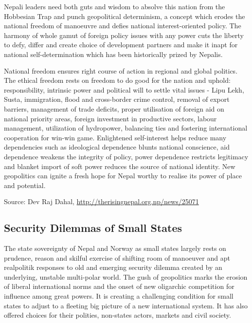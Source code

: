 \documentclass[
  openany]{book}
\begin{document}
Nepali leaders need both guts and wisdom to absolve this nation from the Hobbesian Trap and punch geopolitical determinism, a concept which erodes the national freedom of manoeuvre and defies national interest-oriented policy. The harmony of whole gamut of foreign policy issues with any power cuts the liberty to defy, differ and create choice of development partners and make it inapt for national self-determination which has been historically prized by Nepalis.

National freedom ensures right course of action in regional and global politics. The ethical freedom rests on freedom to do good for the nation and uphold: responsibility, intrinsic power and political will to settle vital issues - Lipu Lekh, Susta, immigration, flood and cross-border crime control, removal of export barriers, management of trade deficits, proper utilisation of foreign aid on national priority areas, foreign investment in productive sectors, labour management, utilization of hydropower, balancing ties and fostering international cooperation for win-win game. Enlightened self-interest helps reduce many dependencies such as ideological dependence blunts national conscience, aid dependence weakens the integrity of policy, power dependence restricts legitimacy and blanket import of soft power reduces the source of national identity. New geopolitics can ignite a fresh hope for Nepal worthy to realise its power of place and potential.

Source: Dev Raj Dahal, \url{http://therisingnepal.org.np/news/25071}

\hypertarget{security-dilemmas-of-small-states}{%
\subsection{Security Dilemmas of Small States}\label{security-dilemmas-of-small-states}}

The state sovereignty of Nepal and Norway as small states largely rests on prudence, reason and skilful exercise of shifting room of manoeuver and apt realpolitik responses to old and emerging security dilemma created by an underlying, unstable multi-polar world. The gush of geopolitics marks the erosion of liberal international norms and the onset of new oligarchic competition for influence among great powers. It is creating a challenging condition for small states to adjust to a fleeting big picture of a new international system. It has also offered choices for their polities, non-states actors, markets and civil society.
\end{document}
